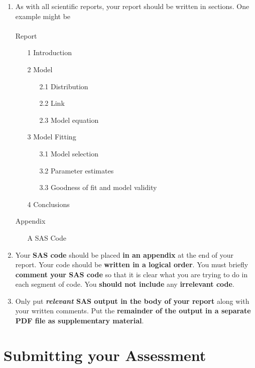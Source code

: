 \documentclass[11pt,a4paper]{article}
\begin{document}
\begin{enumerate}
    \item As with all scientific reports, your report should be written in sections.  One example might be\\
        \\
        Report
        \begin{enumerate}
        \item[1] Introduction
        \item[2] Model
            \begin{enumerate}
            \item[2.1] Distribution
            \item[2.2] Link
            \item[2.3] Model equation
            \end{enumerate}
        \item[3] Model Fitting
            \begin{enumerate}
                \item[3.1] Model selection
                \item[3.2] Parameter estimates
                \item[3.3] Goodness of fit and model validity
            \end{enumerate}
        \item[4] Conclusions
        \end{enumerate}
        Appendix
        \begin{enumerate}
        \item[A] SAS Code
        \end{enumerate}
    \item Your \textbf{SAS code} should be placed \textbf{in an appendix} at the end of your report.  Your code should be \textbf{written in a logical order}.  You must briefly \textbf{comment your SAS code} so that it is clear what you are trying to do in each segment of code.  You \textbf{should not include} any \textbf{irrelevant code}.
    \item Only put \textbf{\emph{relevant} SAS output in the body of your report} along with your written comments.  Put the \textbf{remainder of the output in a separate PDF file as supplementary material}.
\end{enumerate}


\newpage
\section*{Submitting your Assessment}
\end{document}
